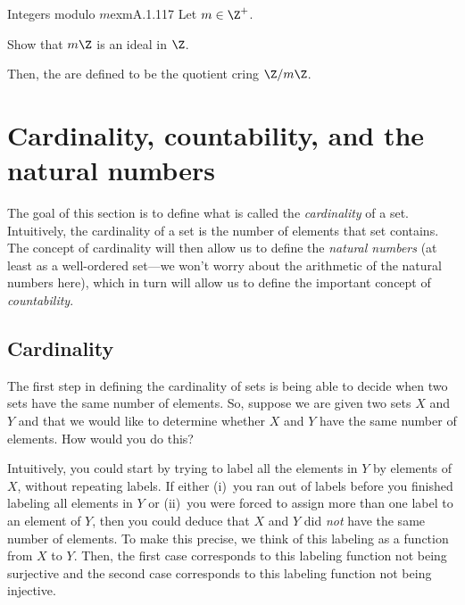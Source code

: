 \begin{exm}{Integers modulo $m$}{exmA.1.117}
Let $m\in \Z ^+$.
\begin{exr}[breakable=false]{}{}
Show that $m\Z$ is an ideal in $\Z$.
\end{exr}
Then, the  are defined to be the quotient cring $\Z /m\Z$.
\end{exm}

\section{Cardinality, countability, and the natural numbers}

The goal of this section is to define what is called the \emph{cardinality} of a set.  Intuitively, the cardinality of a set is the number of elements that set contains.  The concept of cardinality will then allow us to define the \emph{natural numbers} (at least as a well-ordered set---we won't worry about the arithmetic of the natural numbers here), which in turn will allow us to define the important concept of \emph{countability}.

\subsection{Cardinality}\label{sbs1.1.1}

The first step in defining the cardinality of sets is being able to decide when two sets have the same number of elements.  So, suppose we are given two sets $X$ and $Y$ and that we would like to determine whether $X$ and $Y$ have the same number of elements.  How would you do this?

Intuitively, you could start by trying to label all the elements in $Y$ by elements of $X$, without repeating labels.  If either (i)~you ran out of labels before you finished labeling all elements in $Y$ or (ii)~you were forced to assign more than one label to an element of $Y$, then you could deduce that $X$ and $Y$ did \emph{not} have the same number of elements.  To make this precise, we think of this labeling as a function from $X$ to $Y$.  Then, the first case corresponds to this labeling function not being surjective and the second case corresponds to this labeling function not being injective.

